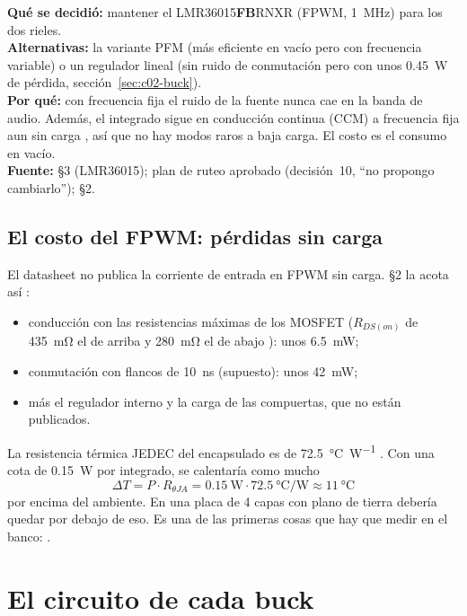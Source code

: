 \begin{decision}
\textbf{Qué se decidió:} mantener el LMR36015\textbf{FB}RNXR (FPWM, \SI{1}{\mega\hertz}) para los dos rieles.\\
\textbf{Alternativas:} la variante PFM (más eficiente en vacío pero con frecuencia variable) o un regulador lineal (sin ruido de conmutación pero con unos \SI{0.45}{\watt} de pérdida, sección~\ref{sec:c02-buck}).\\
\textbf{Por qué:} con frecuencia fija el ruido de la fuente nunca cae en la banda de audio. Además, el integrado sigue en conducción continua (CCM) a frecuencia fija aun sin carga , así que no hay modos raros a baja carga. El costo es el consumo en vacío.\\
\textbf{Fuente:}  §3 (LMR36015); plan de ruteo aprobado (decisión~10, ``no propongo cambiarlo'');  §2.
\end{decision}

\subsection*{El costo del FPWM: pérdidas sin carga}

El datasheet no publica la corriente de entrada en FPWM sin carga.  §2 la acota así \estimado:
\begin{itemize}
  \item conducción con las resistencias máximas de los MOSFET ($R_{DS(on)}$ de \SI{435}{\milli\ohm} el de arriba y \SI{280}{\milli\ohm} el de abajo ): unos \SI{6.5}{\milli\watt};
  \item conmutación con flancos de \SI{10}{\nano\second} (supuesto): unos \SI{42}{\milli\watt};
  \item más el regulador interno y la carga de las compuertas, que no están publicados.
\end{itemize}
La resistencia térmica JEDEC del encapsulado es de \SI{72.5}{\degreeCelsius\per\watt} . Con una cota de \SI{0.15}{\watt} por integrado, se calentaría como mucho
\[
\Delta T = P\cdot R_{\theta JA} = \SI{0.15}{\watt}\cdot\SI{72.5}{\degreeCelsius\per\watt}\approx\SI{11}{\degreeCelsius}
\]
por encima del ambiente. En una placa de 4 capas con plano de tierra debería quedar por debajo de eso. Es una de las primeras cosas que hay que medir en el banco: \medir.

\section{El circuito de cada buck}\label{sec:c02-circuito}

